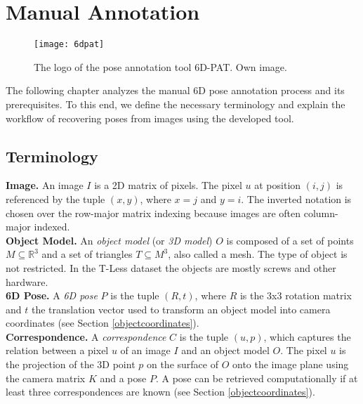 \chapter{Manual Annotation} \label{chapter:manual_annotation}

\begin{figure}[!tbp]
	\centering
    \texttt{[image: 6dpat]}
    \caption{The logo of the pose annotation tool 6D-PAT. Own image.}
    	\label{fig:6dpat_logo}
\end{figure} 

The following chapter analyzes the manual 6D pose annotation process and its prerequisites. To this end, we define the necessary terminology and explain the workflow of recovering poses from images using the developed tool. 

\section{Terminology} \label{section:terminology}

\textbf{Image.} An image $I$ is a 2D matrix of pixels. The pixel $u$ at position $(i, j)$ is referenced by the tuple $(x, y)$, where $x = j$ and $y = i$. The inverted notation is chosen over the row-major matrix indexing because images are often column-major indexed. \\

\noindent\textbf{Object Model.} An \textit{object model} (or \textit{3D model}) $O$ is composed of a set of points $M \subseteq \mathbb{R}^3$ and a set of triangles $T \subseteq M^3$, also called a mesh. The type of object is not restricted. In the T-Less dataset \cite{tless} the objects are mostly screws and other hardware. \\

\noindent\textbf{6D Pose.} A \textit{6D pose} $P$ is the tuple $(R, t)$, where $R$ is the 3x3 rotation matrix and $t$ the translation vector used to transform an object model into camera coordinates (see Section \ref{objectcoordinates}). \\

\noindent\textbf{Correspondence.} A \textit{correspondence} $C$ is the tuple $(u, p)$, which captures the relation between a pixel $u$ of an image $I$ and an object model $O$. The pixel $u$ is the projection of the 3D point $p$ on the surface of $O$ onto the image plane using the camera matrix $K$ and a pose $P$. A pose can be retrieved computationally if at least three correspondences are known (see Section \ref{objectcoordinates}). \\

